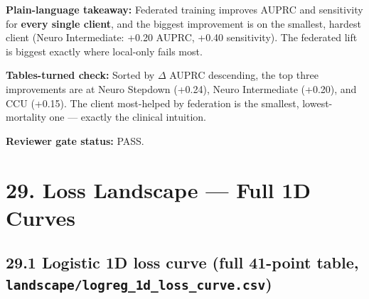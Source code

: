 \documentclass{article}
\begin{document}
\textbf{Plain-language takeaway:} Federated training improves AUPRC and sensitivity for \textbf{every single client}, and the biggest improvement is on the smallest, hardest client (Neuro Intermediate: +0.20 AUPRC, +0.40 sensitivity). The federated lift is biggest exactly where local-only fails most.


\textbf{Tables-turned check:} Sorted by \ensuremath{\Delta} AUPRC descending, the top three improvements are at Neuro Stepdown (+0.24), Neuro Intermediate (+0.20), and CCU (+0.15). The client most-helped by federation is the smallest, lowest-mortality one --- exactly the clinical intuition.


\textbf{Reviewer gate status:} PASS.



\clearpage
\section{29. Loss Landscape --- Full 1D Curves}


\subsection{29.1 Logistic 1D loss curve (full 41-point table, \texttt{landscape/logreg\_1d\_loss\_curve.csv})}
\end{document}

